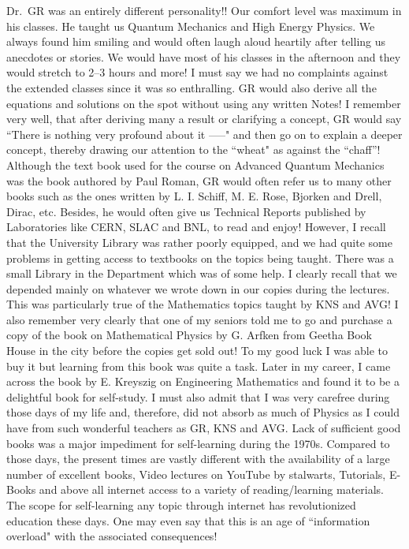 Dr.\ GR was an entirely different personality!! Our comfort level was maximum in his classes. He taught us Quantum Mechanics and High Energy Physics. We always found him smiling and would often laugh aloud heartily after telling us anecdotes or stories. We would have most of his classes in the afternoon and they would stretch to 2--3 hours and more! I must say we had no complaints against the extended classes since it was so enthralling. GR would also derive all the equations and solutions on the spot without using any written Notes! I remember very well, that after deriving many a result or clarifying a concept, GR would say ``There is nothing very profound about it -----" and then go on to explain a deeper concept, thereby drawing our attention to the ``wheat" as against the  ``chaff”! Although the text book used for the course on Advanced Quantum Mechanics was the book authored by Paul Roman, GR would often refer us to many other books such as the ones written by L. I. Schiff, M. E. Rose, Bjorken and Drell, Dirac, etc. Besides, he would often give us Technical Reports published by Laboratories like CERN, SLAC and BNL, to read and enjoy! However, I recall that the University Library was rather poorly equipped, and we had quite some problems in getting access to textbooks on the topics being taught. There was a small Library in the Department which was of some help. I clearly recall that we depended mainly on whatever we wrote down in our copies during the lectures. This was particularly true of the Mathematics topics taught by KNS and AVG! I also remember very clearly that one of my seniors told me to go and purchase a copy of the book on Mathematical Physics by G. Arfken from Geetha Book House in the city before the copies get sold out! To my good luck I was able to buy it but learning from this book was quite a task. Later in my career, I came across the book by E. Kreyszig on Engineering Mathematics and found it to be a delightful book for self-study. I must also admit that I was very carefree during those days of my life and, therefore, did not absorb as much of Physics as I could have from such wonderful teachers as GR, KNS and AVG. Lack of sufficient good books was a major impediment for self-learning during the 1970s. Compared to those days, the present times are vastly different with the availability of a large number of excellent books, Video lectures on YouTube by stalwarts, Tutorials, E-Books and above all internet access to a variety of reading/learning materials. The scope for self-learning any topic through internet has revolutionized education these days. One may even say that this is an age of  ``information overload" with the associated consequences!     

